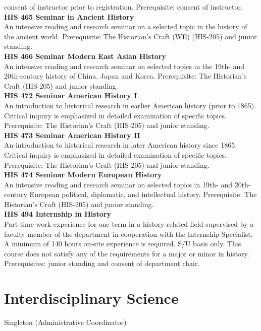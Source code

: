 \documentclass[
  letterpaper,
]{scrbook}
\begin{document}
consent of instructor prior to registration. Prerequisite: consent of
instructor.\\
\textbf{HIS 465 Seminar in Ancient History}\\
An intensive reading and research seminar on a selected topic in the
history of the ancient world. Prerequisite: The Historian's Craft (WE)
(HIS-205) and junior standing.\\
\textbf{HIS 466 Seminar Modern East Asian History}\\
An intensive reading and research seminar on selected topics in the
19th- and 20th-century history of China, Japan and Korea. Prerequisite:
The Historian's Craft (HIS-205) and junior standing.\\
\textbf{HIS 472 Seminar American History I}\\
An introduction to historical research in earlier American history
(prior to 1865). Critical inquiry is emphasized in detailed examination
of specific topics. Prerequisite: The Historian's Craft (HIS-205) and
junior standing.\\
\textbf{HIS 473 Seminar American History II}\\
An introduction to historical research in later American history since
1865. Critical inquiry is emphasized in detailed examination of specific
topics. Prerequisite: The Historian's Craft (HIS-205) and junior
standing.\\
\textbf{HIS 474 Seminar Modern European History}\\
An intensive reading and research seminar on selected topics in 19th-
and 20th-century European political, diplomatic, and intellectual
history. Prerequisite: The Historian's Craft (HIS-205) and junior
standing.\\
\textbf{HIS 494 Internship in History}\\
Part-time work experience for one term in a history-related field
supervised by a faculty member of the department in cooperation with the
Internship Specialist. A minimum of 140 hours on-site experience is
required. S/U basis only. This course does not satisfy any of the
requirements for a major or minor in history. Prerequisites: junior
standing and consent of department chair.

\section{Interdisciplinary Science}\label{interdisciplinary-science}

Singleton (Administrative Coordinator)
\end{document}
